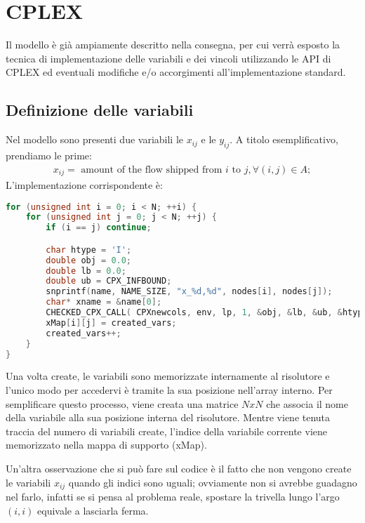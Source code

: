 
\section{CPLEX}\label{sec:cplex}
Il modello è già ampiamente descritto nella consegna, per cui verrà esposto la tecnica di implementazione delle variabili e dei vincoli utilizzando le API di CPLEX
ed eventuali modifiche e/o accorgimenti all'implementazione standard.

\subsection{Definizione delle variabili}
Nel modello sono presenti due variabili le $x_{ij}$ e le $y_{ij}$.
A titolo esemplificativo, prendiamo le prime:
%
\begin{gather*}
x_{ij} = \text{ amount of the flow shipped from } i \text{ to } j, ∀ (i,j) \in A;
\end{gather*}
%
L'implementazione corrispondente è:
%
\label{lst:cplex-variabili}
\begin{lstlisting}[language=C++, caption=Creazione delle variabili $x_{ij}$]
for (unsigned int i = 0; i < N; ++i) {
	for (unsigned int j = 0; j < N; ++j) {
		if (i == j) continue;

		char htype = 'I';
		double obj = 0.0;
		double lb = 0.0;
		double ub = CPX_INFBOUND;
		snprintf(name, NAME_SIZE, "x_%d,%d", nodes[i], nodes[j]);
		char* xname = &name[0];
		CHECKED_CPX_CALL( CPXnewcols, env, lp, 1, &obj, &lb, &ub, &htype, &xname );
		xMap[i][j] = created_vars;
		created_vars++;
	}
}
\end{lstlisting}
%
Una volta create, le variabili sono memorizzate internamente al risolutore e l'unico modo per accedervi è tramite la sua posizione nell'array interno.
Per semplificare questo processo, viene creata una matrice $NxN$ che associa il nome della variabile alla sua posizione interna del risolutore.
Mentre viene tenuta traccia del numero di variabili create, l'indice della variabile corrente viene memorizzato nella mappa di supporto (\textsf{xMap}).

Un'altra osservazione che si può fare sul codice è il fatto che non vengono create le variabili $x_{ij}$ quando gli indici sono uguali;
ovviamente non si avrebbe guadagno nel farlo, infatti se si pensa al problema reale, spostare la trivella lungo l'argo $(i, i)$ equivale a lasciarla ferma.
